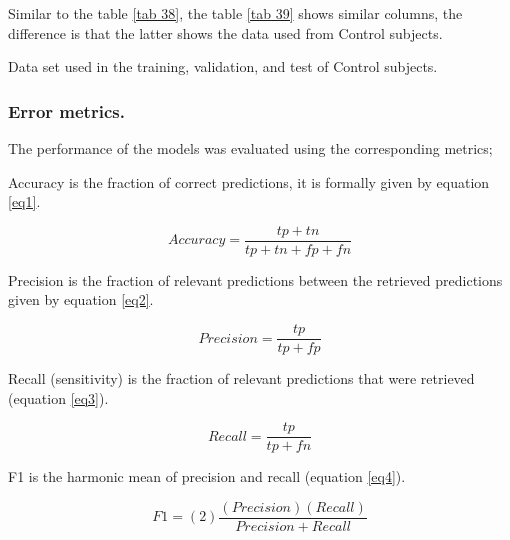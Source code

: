 \documentclass[letterpaper,12pt,openright,oneside]{article}
\begin{document}
Similar to the table \ref{tab 38}, the table \ref{tab 39} shows similar columns, the difference is that the latter shows the data used from Control subjects.


\begin{table}[H]
\centerline{}
\caption{Data set used in the training, validation, and test of Control subjects.}
\label{tab 39}
\end{table}

\subsubsection{Error metrics.}

The performance of the models was evaluated using the corresponding metrics;

Accuracy is the fraction of correct predictions, it is formally given by equation \ref{eq1}.

\begin{equation}\label{eq1}
Accuracy = \frac{tp+tn}{tp+tn+fp+fn}
\end{equation}


Precision is the fraction of relevant predictions between the retrieved predictions given by equation \ref{eq2}.

\begin{equation}\label{eq2}
Precision = \frac{tp}{tp+fp}
\end{equation}

Recall (sensitivity) is the fraction of relevant predictions that were retrieved (equation \ref{eq3}).

\begin{equation}\label{eq3}
Recall = \frac{tp}{tp+fn}
\end{equation}

F1 is the harmonic mean of precision and recall (equation \ref{eq4}).


\begin{equation}\label{eq4}
F1 = (2) \frac{(Precision)(Recall)}{Precision+Recall}
\end{equation}

\end{document}
